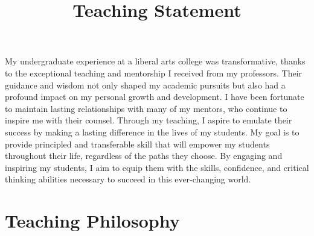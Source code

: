 \documentclass[11pt,a4paper,sans]{moderncv} %
\title{Teaching Statement}
\begin{document}
\makecvtitle %

\setlength\parskip{8px}

My undergraduate experience at a liberal arts college was transformative, thanks to the exceptional teaching and mentorship I received from my professors. 
Their guidance and wisdom not only shaped my academic pursuits but also had a profound impact on my personal growth and development. 
I have been fortunate to maintain lasting relationships with many of my mentors, who continue to inspire me with their counsel. 
Through my teaching, I aspire to emulate their success by making a lasting difference in the lives of my students. 
My goal is to provide principled and transferable skill that will empower my students throughout their life, regardless of the paths they choose. 
By engaging and inspiring my students, I aim to equip them with the skills, confidence, and critical thinking abilities necessary to succeed in this ever-changing world.

\section{Teaching Philosophy}
\end{document}
